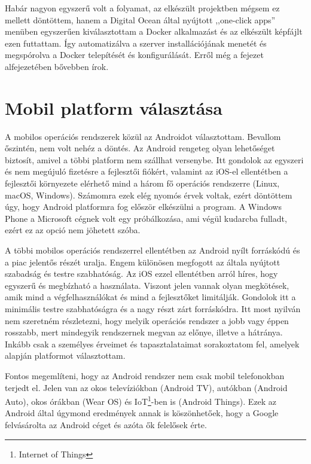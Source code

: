 \documentclass{thesis-ekf}
\theoremstyle{definition}
\theoremstyle{remark}
\begin{document}
Habár nagyon egyszerű volt a folyamat, az elkészült projektben mégsem ez mellett döntöttem, hanem a Digital Ocean által nyújtott ,,one-click apps'' menüben egyszerűen kiválasztottam a Docker alkalmazást és az elkészült képfájlt ezen futtattam. 
Így automatizálva a szerver installációjának menetét és megspórolva a Docker telepítését és konfigurálását.
Erről még a  fejezet  alfejezetében bővebben írok.

\section{Mobil platform választása}

A mobilos operációs rendszerek közül az Androidot választottam.
Bevallom őszintén, nem volt nehéz a döntés. 
Az Android rengeteg olyan lehetőséget biztosít, amivel a többi platform nem szállhat versenybe.
Itt gondolok az egyszeri és nem megújuló fizetésre a fejlesztői fiókért, valamint az iOS-el ellentétben a fejlesztői környezete elérhető mind a három fő operációs rendszerre (Linux, macOS, Windows).
Számomra ezek elég nyomós érvek voltak, ezért döntöttem úgy, hogy Android platformra fog először elkészülni a program.
A Windows Phone a Microsoft cégnek volt egy próbálkozása, ami végül kudarcba fulladt, ezért ez az opció nem jöhetett szóba.

A többi mobilos operációs rendszerrel ellentétben az Android nyílt forráskódú és a piac jelentős részét uralja.
Engem különösen megfogott az általa nyújtott szabadság és testre szabhatóság.
Az iOS ezzel ellentétben arról híres, hogy egyszerű és megbízható a használata.
Viszont jelen vannak olyan megkötések, amik mind a végfelhasználókat és mind a fejlesztőket limitálják.
Gondolok itt a minimális testre szabhatóságra és a nagy részt zárt forráskódra.
Itt most nyilván nem szeretném részletezni, hogy melyik operációs rendszer a jobb vagy éppen rosszabb, mert mindegyik rendszernek megvan az előnye, illetve a hátránya.
Inkább csak a személyes érveimet és tapasztalataimat sorakoztatom fel, amelyek alapján platformot választottam.

Fontos megemlíteni, hogy az Android rendszer nem csak mobil telefonokban terjedt el.
Jelen van az okos televíziókban (Android TV), autókban (Android Auto), okos órákban (Wear OS) és IoT\footnote{Internet of Things}-ben is (Android Things).
Ezek az Android által úgymond eredmények annak is köszönhetőek, hogy a Google felvásárolta az Android céget és azóta ők felelősek érte.
\end{document}
